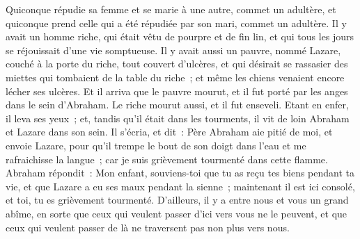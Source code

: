 \begin{multicols}{2}
Quiconque répudie sa femme et se marie à une autre, commet un adultère, et quiconque prend celle qui a été répudiée par son mari, commet un adultère.
Il y avait un homme riche, qui était vêtu de pourpre et de fin lin, et qui tous les jours se réjouissait d'une vie somptueuse.
Il y avait aussi un pauvre, nommé Lazare, couché à la porte du riche, tout couvert d'ulcères,
et qui désirait se rassasier des miettes qui tombaient de la table du riche~; et même les chiens venaient encore lécher ses ulcères.
Et il arriva que le pauvre mourut, et il fut porté par les anges dans le sein d'Abraham. Le riche mourut aussi, et il fut enseveli.
Etant en enfer, il leva ses yeux~; et, tandis qu'il était dans les tourments, il vit de loin Abraham et Lazare dans son sein.
Il s'écria, et dit~: Père Abraham aie pitié de moi, et envoie Lazare, pour qu'il trempe le bout de son doigt dans l'eau et me rafraichisse la langue~; car je suis grièvement tourmenté dans cette flamme.
Abraham répondit~: Mon enfant, souviens-toi que tu as reçu tes biens pendant ta vie, et que Lazare a eu ses maux pendant la sienne~; maintenant il est ici consolé, et toi, tu es grièvement tourmenté.
D'ailleurs, il y a entre nous et vous un grand abîme, en sorte que ceux qui veulent passer d'ici vers vous ne le peuvent, et que ceux qui veulent passer de là ne traversent pas non plus vers nous.

\end{multicols}
